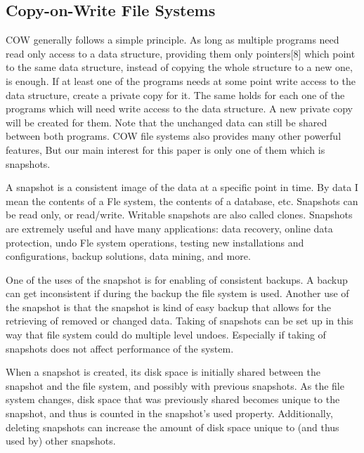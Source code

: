 \documentclass[12pt,twoside]{article}
\begin{document}
\subsection{Copy-on-Write File Systems}
COW generally follows a simple principle. As long as multiple programs need read only access to a data structure, providing them only pointers[8] which point to the same data structure, instead of copying the whole structure to a new one, is enough. If at least one of the programs needs at some point write access to the data structure, create a private copy for it. The same holds for each one of the programs which will need write access to the data structure. A new private copy will be created for them. Note that the unchanged data can still be shared between both programs. COW file systems also provides many other powerful features, But our main interest for this paper is only one of them which is snapshots.

A snapshot is a consistent image of the data at a specific point in time. By data I mean the contents of a Fle system, the contents of a database, etc. Snapshots can be read only, or read/write. Writable snapshots are also called clones. Snapshots are extremely useful and have many applications: data recovery, online data protection, undo Fle system operations, testing new installations and configurations, backup solutions, data mining, and more. 

One of the uses of the snapshot is for enabling of consistent backups. A backup can get inconsistent if during the backup the file system is used. Another use of the snapshot is that the snapshot is kind of easy backup that allows for the retrieving of removed or changed data. Taking of snapshots can be set up in this way that file system could do multiple level undoes. Especially if taking of snapshots does not affect performance of the system.

When a snapshot is created, its disk space is initially shared between the snapshot and the file system, and possibly with previous snapshots. As the file system changes, disk space that was previously shared becomes unique to the snapshot, and thus is counted in the snapshot's used property. Additionally, deleting snapshots can increase the amount of disk space unique to (and thus used by) other snapshots.
\end{document}
